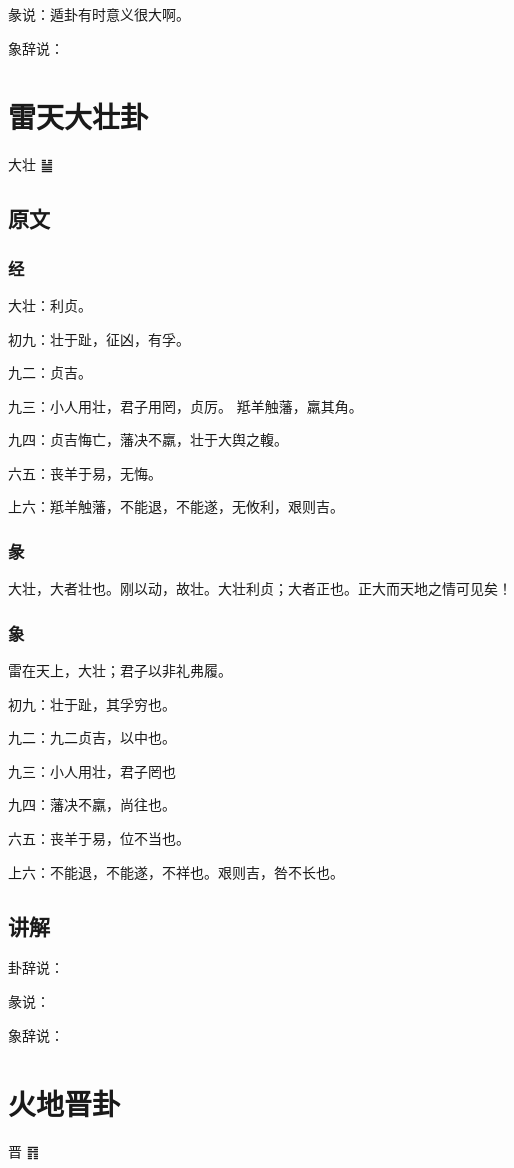 \documentclass[12pt,oneside]{book}
\begin{document}
彖说：遁卦有时意义很大啊。

象辞说：


\chapter{雷天大壮卦}
大壮 {\Large ䷡}

\section{原文}

\subsection{经}
大壮：利贞。

初九：壮于趾，征凶，有孚。

九二：贞吉。

九三：小人用壮，君子用罔，贞厉。 羝羊触藩，羸其角。

九四：贞吉悔亡，藩决不羸，壮于大舆之輹。

六五：丧羊于易，无悔。

上六：羝羊触藩，不能退，不能遂，无攸利，艰则吉。

\subsection{彖}
大壮，大者壮也。刚以动，故壮。大壮利贞；大者正也。正大而天地之情可见矣！

\subsection{象}
雷在天上，大壮；君子以非礼弗履。

初九：壮于趾，其孚穷也。

九二：九二贞吉，以中也。

九三：小人用壮，君子罔也

九四：藩决不羸，尚往也。

六五：丧羊于易，位不当也。

上六：不能退，不能遂，不祥也。艰则吉，咎不长也。

\section{讲解}
卦辞说：

彖说：

象辞说：

\chapter{火地晋卦}
晋 {\Large ䷢}
\end{document}
